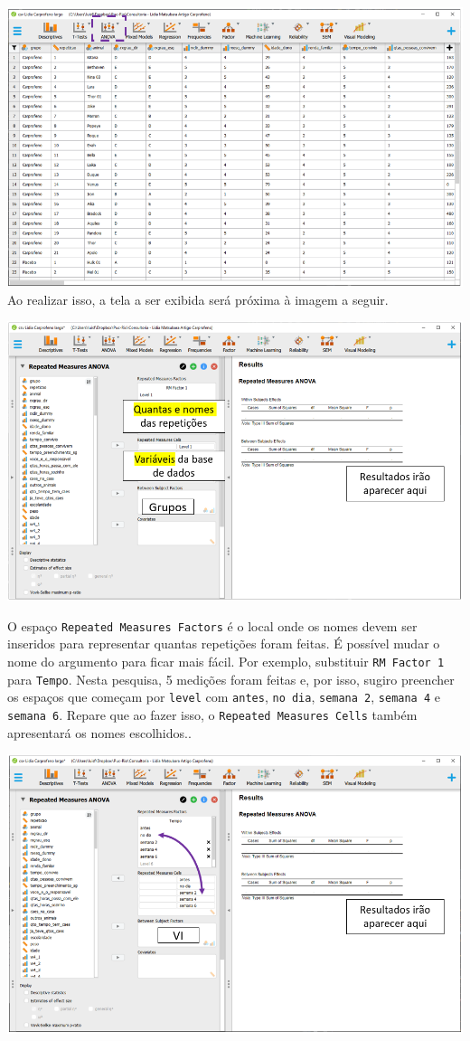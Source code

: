 \documentclass[
]{book}
\begin{document}
\includegraphics{./img/cap_anovarm_interface0.png}
Ao realizar isso, a tela a ser exibida será próxima à imagem a seguir.

\includegraphics{./img/cap_anovarm_interface.png}

O espaço \texttt{Repeated\ Measures\ Factors} é o local onde os nomes devem ser inseridos para representar quantas repetições foram feitas. É possível mudar o nome do argumento para ficar mais fácil. Por exemplo, substituir \texttt{RM\ Factor\ 1} para \texttt{Tempo}. Nesta pesquisa, 5 medições foram feitas e, por isso, sugiro preencher os espaços que começam por \texttt{level} com \texttt{antes}, \texttt{no\ dia}, \texttt{semana\ 2}, \texttt{semana\ 4} e \texttt{semana\ 6}. Repare que ao fazer isso, o \texttt{Repeated\ Measures\ Cells} também apresentará os nomes escolhidos..

\includegraphics{./img/cap_anovarm_interface2.png}
\end{document}
